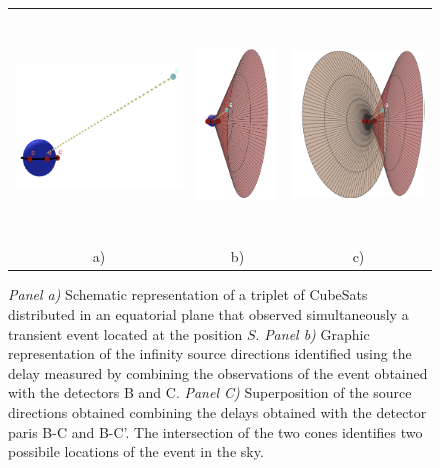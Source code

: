 \documentclass[]{spie}  %
\begin{document}
\begin{figure}
\begin{center}
\begin{tabular}{ccc}
\includegraphics[height=5cm]{trinag_fig1} &
\includegraphics[height=6cm]{triang_fig2} &
\includegraphics[height=6cm]{triang_fig3} \\
a) & b) & c)\\
\end{tabular}
\end{center}
\caption[example] 
{ \label{fig:triangulation2} 
\emph{Panel a)} Schematic representation of a triplet of CubeSats distributed in an equatorial plane that observed simultaneously a transient event located at the position $S$. \emph{Panel b)} Graphic representation of the infinity source directions identified using the delay measured by combining the observations of the event obtained with the detectors B and C. \emph{Panel C)} Superposition of the source directions obtained combining the delays obtained with the detector paris B-C and B-C'. The intersection of the two cones identifies two possibile locations of the event in the sky.}
\end{figure}
\end{document}
